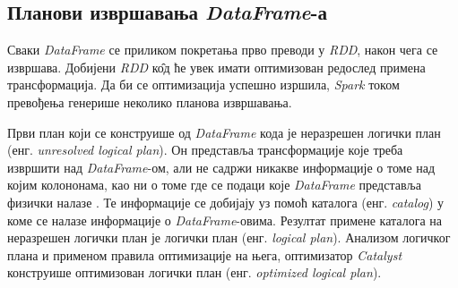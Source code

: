 \documentclass[12pt,oneside]{memoir}
\begin{document}
\subsection{Планови извршавања \textit{DataFrame}-а}
\label{subsec:spark_exec_plans}


Сваки \textit{DataFrame} се приликом покретања прво преводи у \textit{RDD}, након чега се извршава. Добијени \textit{RDD} к\^{о}д ће увек имати оптимизован редослед примена трансформација. Да би се оптимизација успешно изршила, \textit{Spark} током превођења генерише неколико планова извршавања.

Први план који се конструише од \textit{DataFrame} кода је неразрешен логички план (енг. \textit{unresolved logical plan}). Он представља трансформације које треба извршити над \textit{DataFrame}-ом, али не садржи никакве информације о томе над којим колононама, као ни о томе где се подаци које \textit{DataFrame} представља физички налазе \cite{spark_guide}. Те информације се добијају уз помоћ каталога (енг. \textit{catalog}) у коме се налазе информације о \textit{DataFrame}-овима. Резултат примене каталога на неразрешен логички план је логички план (енг. \textit{logical plan}). Анализом логичког плана и применом правила оптимизације на њега, оптимизатор \textit{Catalyst} конструише оптимизован логички план (енг. \textit{optimized logical plan}).


\end{document}
